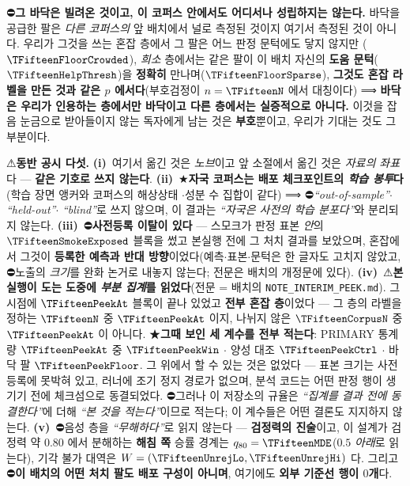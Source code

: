 \documentclass[11pt]{report}
\numberwithin{equation}{chapter}
\numberwithin{figure}{chapter}
\numberwithin{table}{chapter}
\begin{document}
⛔\textbf{그 바닥은 빌려온 것이고, 이 코퍼스 안에서도 어디서나 성립하지는 않는다.} 바닥을
공급한 팔은 \emph{다른 코퍼스의} 앞 배치에서 널로 측정된 것이지 여기서 측정된 것이 아니다.
우리가 그것을 쓰는 혼잡 층에서 그 팔은 어느 판정 문턱에도 닿지 않지만
($\TFifteenFloorCrowded$), \emph{희소} 층에서는 같은 팔이 이 배치 자신의 \textbf{도움
문턱}($\TFifteenHelpThresh$)을 \textbf{정확히} 만나며($\TFifteenFloorSparse$),
\textbf{그것도 혼잡 라벨을 만든 것과 같은 $p$ 에서다}(부호검정이 $n = \TFifteenN$ 에서
대칭이다) ⟹ \textbf{바닥은 우리가 인용하는 층에서만 바닥이고 다른 층에서는 실증적으로
아니다.}
이것을 잡음 눈금으로 받아들이지 않는 독자에게 남는 것은 \textbf{부호}뿐이고, 우리가
기대는 것도 그 부분이다.

⚠\textbf{동반 공시 다섯.} \textbf{(i)}~여기서 옮긴 것은 \emph{노브}이고 앞 소절에서 옮긴
것은 \emph{자료의 좌표}다 --- \textbf{같은 기호로 쓰지 않는다}. \textbf{(ii)}~★\textbf{자국
코퍼스는 배포 체크포인트의 \emph{학습 봉투}다}(학습 장면 앵커와 코퍼스의 해상상태
$\cdot$성분 수 집합이 같다) ⟹ ⛔\emph{``out-of-sample''}$\cdot$\emph{``held-out''}$\cdot$
\emph{``blind''}로 쓰지 않으며, 이 결과는 \emph{``자국은 사전의 학습 분포다''}와 분리되지
않는다. \textbf{(iii)}~⛔\textbf{사전등록 이탈이 있다} --- 스모크가 판정 표본 \emph{안}의
$\TFifteenSmokeExposed$ 블록을 썼고 본실행 전에 그 처치 결과를 보았으며, 혼잡에서 그것이
\textbf{등록한 예측과 반대 방향}이었다(예측$\cdot$표본$\cdot$문턱은 한 글자도 고치지 않았고,
⛔노출의 \emph{크기}를 완화 논거로 내놓지 않는다; 전문은 배치의 개정문에 있다).
\textbf{(iv)}~⚠\textbf{본실행이 도는 도중에 \emph{부분 집계}를 읽었다}(전문 =
배치의 \texttt{NOTE\_INTERIM\_PEEK.md}). 그 시점에 $\TFifteenPeekAt$ 블록이 끝나 있었고
\textbf{전부 혼잡 층}이었다 --- 그 층의 라벨을 정하는 $\TFifteenN$ 중 $\TFifteenPeekAt$
이지, 나뉘지 않은 $\TFifteenCorpusN$ 중 $\TFifteenPeekAt$ 이 아니다. ★\textbf{그때 보인
세 계수를 전부 적는다}: PRIMARY 통계량 $\TFifteenPeekAt$ 중 $\TFifteenPeekWin$ $\cdot$
양성 대조 $\TFifteenPeekCtrl$ $\cdot$ 바닥 팔 $\TFifteenPeekFloor$. 그 위에서 할 수
있는 것은 없었다 --- 표본 크기는 사전등록에 못박혀 있고, 러너에 조기 정지 경로가 없으며,
분석 코드는 어떤 판정 행이 생기기 전에 체크섬으로 동결되었다. ⛔그러나 이 저장소의 규율은
\emph{``집계를 결과 전에 동결한다''}에 더해 \emph{``본 것을 적는다''}이므로 적는다; 이
계수들은 어떤 결론도 지지하지 않는다. \textbf{(v)}~⛔음성 층을 \emph{``무해하다''}로 읽지
않는다 --- \textbf{검정력의 진술}이고, 이 설계가 검정력 약 $0.80$ 에서 분해하는
\textbf{해침 쪽} 승률 경계는 $q_{80} = \TFifteenMDE$($0.5$ \emph{아래}로 읽는다), 기각 불가
대역은 $W = (\TFifteenUnrejLo, \TFifteenUnrejHi)$ 다.
그리고 ⛔\textbf{이 배치의 어떤 처치 팔도 배포 구성이 아니며}, 여기에도 \textbf{외부
기준선 행이 $0$개}다.
\end{document}
